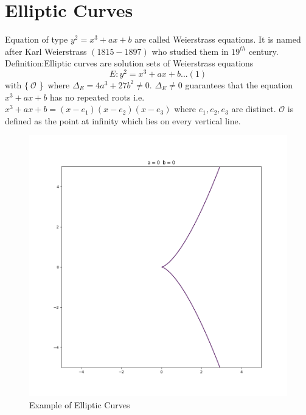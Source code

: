 \documentclass[12pt,a4paper]{report}
\begin{document}
\section{Elliptic Curves}
Equation of type $ y^2 = x^3+ax+b $ are called Weierstrass equations. It is named after Karl Weierstrass $(1815-1897)$ who studied them in $19^{th}$ century. \\
Definition:Elliptic curves are solution sets of Weierstrass equations
$$E:y^2 = x^3+ax+b ...(1)$$ with  $ \{\ \mathscr{O}  $ \}\ where $\Delta_E = 4a^3+27b^2\neq 0$. 
$\Delta_E \neq 0$ guarantees that the equation $x^3+ax+b$ has no repeated roots i.e. 
$ x^3+ax+b=(x-e_1)(x-e_2)(x-e_3)$ where $e_1,e_2,e_3$ are distinct. $  \mathscr{O}  $  is defined as the point at infinity which lies on every vertical line.\\
\begin{figure}[h!]
\caption{Example of Elliptic Curves}
\includegraphics[scale=0.32]{Figure_1}

\end{figure}
\end{document}
